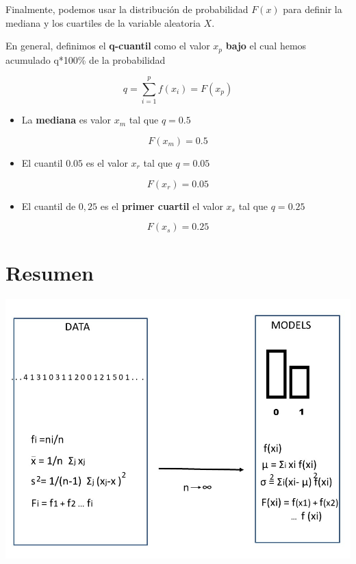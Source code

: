 \documentclass[
]{book}
\providecommand{\tightlist}{%
  \setlength{\itemsep}{0pt}\setlength{\parskip}{0pt}}
\begin{document}
Finalmente, podemos usar la distribución de probabilidad \(F(x)\) para definir la mediana y los cuartiles de la variable aleatoria \(X\).

En general, definimos el \textbf{q-cuantil} como el valor \(x_{p}\) \textbf{bajo} el cual hemos acumulado q*100\% de la probabilidad

\[q=\sum_{i=1}^pf(x_i) = F (x_p)\]

\begin{itemize}
\tightlist
\item
  La \textbf{mediana} es valor \(x_m\) tal que \(q=0.5\)
\end{itemize}

\[F(x_{m})=0.5\]

\begin{itemize}
\tightlist
\item
  El cuantil \(0.05\) es el valor \(x_{r}\) tal que \(q=0.05\)
\end{itemize}

\[F(x_{r})=0.05\]

\begin{itemize}
\tightlist
\item
  El cuantil de \(0,25\) es el \textbf{primer cuartil} el valor \(x_{s}\) tal que \(q=0.25\)
\end{itemize}

\[F(x_{s})=0.25\]

\hypertarget{resumen}{%
\section{Resumen}\label{resumen}}

\includegraphics{./figures/randomvarsum.JPG}
\end{document}
